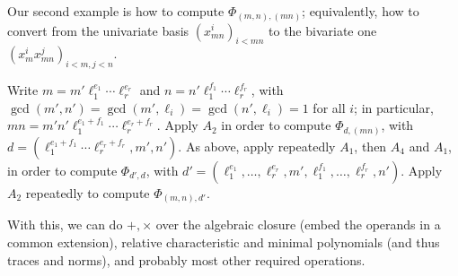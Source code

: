 \documentclass{sig-alternate}
\begin{document}
Our second example is how to compute $\Phi_{(m,n), (mn)}$;
equivalently, how to convert from the univariate basis $(x_{mn}^i)_{i
  < mn}$ to the bivariate one $(x_m^i x_{mn}^j)_{i < m, j < n}$.

Write $m = m' \ell_1^{e_1}\cdots \ell_r^{e_r}$ and $n = n'
\ell_1^{f_1}\cdots \ell_r^{f_r}$, with
$\gcd(m',n')=\gcd(m',\ell_i)=\gcd(n',\ell_i)=1$ for all $i$; in
particular, $mn = m' n' \ell_1^{e_1+f_1}\cdots \ell_r^{e_r+f_r}$.
Apply $A_2$ in order to compute $\Phi_{d,(mn)}$, with $d =
(\ell_1^{e_1+f_1}\cdots\ell_r^{e_r+f_r}, m', n')$. As above, apply
repeatedly $A_1$, then $A_4$ and $A_1$, in order to compute
$\Phi_{d',d}$, with $d'=(\ell_1^{e_1},\dots, \ell_r^{e_r},
m',\ell_1^{f_1},\dots,\ell_r^{f_r}, n')$. Apply $A_2$ repeatedly
to compute $\Phi_{(m,n),d'}$.

With this, we can do $+,\times$ over the algebraic closure (embed the
operands in a common extension), relative characteristic and minimal
polynomials (and thus traces and norms), and probably most other
required operations.


 
\end{document}
